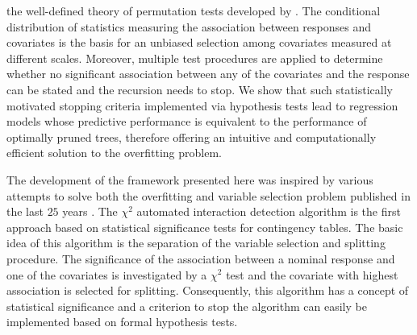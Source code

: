 the well-defined theory of permutation tests developed by \cite{StrasserWeber1999}. 
The conditional distribution of statistics measuring the association between
responses and covariates is the basis for an unbiased selection among
covariates measured at different scales. 
Moreover, multiple test procedures are applied to determine whether no significant 
association between any of the covariates and the response can be stated and 
the recursion needs to stop. We show that such 
statistically motivated stopping criteria implemented via hypothesis tests lead
to regression models whose predictive performance is equivalent to the
performance of optimally pruned trees,
therefore offering an intuitive and computationally
efficient solution to the overfitting problem.

The development of the framework presented here was inspired by various 
attempts 
to solve both the overfitting and variable selection
problem published in the last $25$ years \citep[a far more
detailed overview is given by][]{Murthy1998}. 
The $\chi^2$ automated interaction detection 
algorithm \citep[`CHAID', ][]{Kass1980} is the first approach based on 
statistical significance tests for contingency tables. 
The basic idea of this algorithm is the separation of the variable selection and
splitting procedure. The significance of the association between a nominal
response and one of the covariates is investigated by a $\chi^2$ test 
and the covariate with highest association is selected for splitting.
Consequently, this algorithm has a concept of statistical significance and a
criterion to stop the algorithm can easily be implemented based on formal   
hypothesis tests. 


